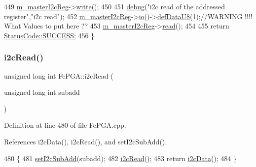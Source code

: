 \begin{DoxyCode}
449   \hyperlink{classFePGA_adb390ea8de4a6cbce648dc62e4405f32}{m\_masterI2cReg}->\hyperlink{classIOobject_a9f6984bc9f0fadcf800f1be2523ac744}{write}();
450 
451   \hyperlink{classObject_aac010553f022165573714b7014a15f0d}{debug}(\textcolor{stringliteral}{"i2c read of the addressed register"},\textcolor{stringliteral}{"i2c read"});
452   \hyperlink{classFePGA_adb390ea8de4a6cbce648dc62e4405f32}{m\_masterI2cReg}->\hyperlink{classIOobject_af04fb94137c3d86849f478ac5afab5d1}{io}()->\hyperlink{classIOdata_a80bb230b61062b447db5832e43bf7b44}{defDataU8}(1);\textcolor{comment}{//WARNING !!!! What Values to put here ??}
453   \hyperlink{classFePGA_adb390ea8de4a6cbce648dc62e4405f32}{m\_masterI2cReg}->\hyperlink{classIOobject_aa07610c11963b1db6710e3c76ceea456}{read}();
454 
455   \textcolor{keywordflow}{return} \hyperlink{classStatusCode_a6f565cbeadc76d14c72f047e5e85eb4badd0da38d3ba0d922efd1f4619bc37ad8}{StatusCode::SUCCESS};
456 \}
\end{DoxyCode}
\mbox{\label{classFePGA_adf1c43786131d0f500b4662a877229c7}} 
\subsubsection{\texorpdfstring{i2c\+Read()}{i2cRead()}\hspace{0.1cm}{\footnotesize\ttfamily [2/2]}}
{\footnotesize\ttfamily unsigned long int Fe\+P\+G\+A\+::i2c\+Read (\begin{DoxyParamCaption}\item[{unsigned long int}]{subadd }\end{DoxyParamCaption})}



Definition at line 480 of file Fe\+P\+G\+A.\+cpp.



References i2c\+Data(), i2c\+Read(), and set\+I2c\+Sub\+Add().


\begin{DoxyCode}
480                                                         \{
481   \hyperlink{classFePGA_a37c1ee5bf89667c641f321479697166f}{setI2cSubAdd}(subadd);
482   \hyperlink{classFePGA_a939c5c23077210a2ad851a12694657a4}{i2cRead}();
483   \textcolor{keywordflow}{return} \hyperlink{classFePGA_a9c261a09d323c07ec4b9e925d4dfc353}{i2cData}();
484 \}
\end{DoxyCode}
\mbox{\label{classFePGA_ab51ac1c71e33f7444212de0e89e1f436}} 
